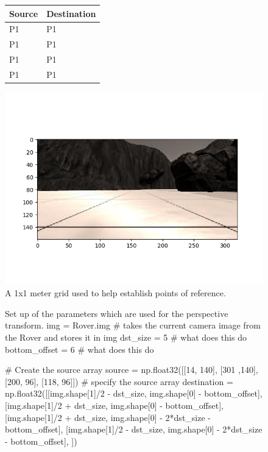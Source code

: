 \documentclass[a4paper]{article}
\begin{document}
\begin{figure}[h]
	\begin{minipage}[m]{0.45\linewidth}
		\centering
		\vspace{0.25cm}
		\begin{tabular}{ll}
		\toprule
		\textbf{Source} & \textbf{Destination}\\
		\midrule
		P1 & P1\\
		P1 & P1\\
		P1 & P1\\
		P1 & P1\\
		\bottomrule
		\end{tabular}
	\end{minipage}
	\hspace{0.5cm}
	\begin{minipage}[m]{0.45\linewidth}
		\centering
		\includegraphics[scale=0.5]{image3}
		\vspace{-1cm}
		\caption{A 1x1 meter grid used to help establish points of reference.}
	\end{minipage}
\end{figure}

\begin{figure}[h]\scriptsize
\begin{sexylisting}{Set up of the parameters which are used for the perspective transform.}
img = Rover.img # takes the current camera image from the Rover and stores it in img
dst_size = 5 # what does this do
bottom_offset = 6 # what does this do
		
# Create the source array 
source = np.float32([[14, 140], [301 ,140],[200, 96], [118, 96]]) # specify the source array
destination = np.float32([[img.shape[1]/2 - dst_size, img.shape[0] - bottom_offset],
	                  [img.shape[1]/2 + dst_size, img.shape[0] - bottom_offset],
			  [img.shape[1]/2 + dst_size, img.shape[0] - 2*dst_size - bottom_offset], 
			  [img.shape[1]/2 - dst_size, img.shape[0] - 2*dst_size - bottom_offset],
			  ])	
\end{sexylisting}
\end{figure}
\end{document}
